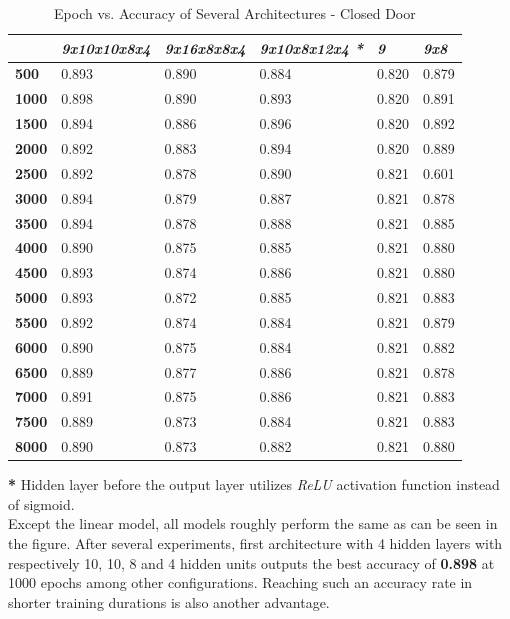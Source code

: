 \documentclass[conference]{IEEEtran}
\begin{document}
\begin{table}[ht]
	\centering
	\caption{Epoch vs. Accuracy of Several Architectures - Closed Door}
	\label{AllArches}
	\begin{tabular}{|l|l|l|l|l|l|}
		\hline
		& \textit{9x10x10x8x4} 
		& \textit{9x16x8x8x4}
		& \textit{9x10x8x12x4 \textbf{*}}
		& \textit{9}
		& \textit{9x8}\\ \hline
		\textbf{500} & 0.893 & 0.890 & 0.884 & 0.820 & 0.879\\ \hline
		\textbf{1000} & \cellcolor{green!25}0.898 & 0.890 & 0.893 & 0.820 & 0.891\\
		\hline
		\textbf{1500} & 0.894 & 0.886 & 0.896 & 0.820 & 0.892\\ \hline
		\textbf{2000} & 0.892& 0.883 & 0.894 & 0.820 & 0.889\\ \hline
		\textbf{2500} & 0.892 & 0.878 & 0.890 &  0.821 & 0.601\\
		\hline
		\textbf{3000} & 0.894 & 0.879 & 0.887 & 0.821 & 0.878\\ \hline
		\textbf{3500} & 0.894 & 0.878 & 0.888 & 0.821 & 0.885\\ \hline
		\textbf{4000} & 0.890 & 0.875 & 0.885 & 0.821 & 0.880\\ \hline
		\textbf{4500} & 0.893 & 0.874 & 0.886 & 0.821 & 0.880\\ \hline
		\textbf{5000} & 0.893 &  0.872 & 0.885 & 0.821 & 0.883\\ \hline
		\textbf{5500} & 0.892 & 0.874 & 0.884 & 0.821 & 0.879\\ \hline
		\textbf{6000} & 0.890 & 0.875 & 0.884 & 0.821 & 0.882\\ \hline 
		\textbf{6500} & 0.889 & 0.877 & 0.886 & 0.821 & 0.878\\ \hline
		\textbf{7000} & 0.891 & 0.875 & 0.886 & 0.821 & 0.883\\ \hline 
		\textbf{7500} & 0.889 & 0.873 & 0.884 & 0.821 & 0.883\\ \hline
		\textbf{8000} & 0.890 & 0.873 & 0.882 & 0.821 & 0.880\\ \hline
	\end{tabular}
\end{table}
\indent\textbf{*} Hidden layer before the output layer utilizes \textit{ReLU} activation function instead of sigmoid.\\

Except the linear model, all models roughly perform the same as can be seen in the figure. After several experiments, first architecture with 4 hidden layers with respectively 10, 10, 8 and 4 hidden units outputs the best accuracy of \textbf{0.898} at 1000 epochs among other configurations. Reaching such an accuracy rate in shorter training durations is also another advantage.\\
\end{document}
